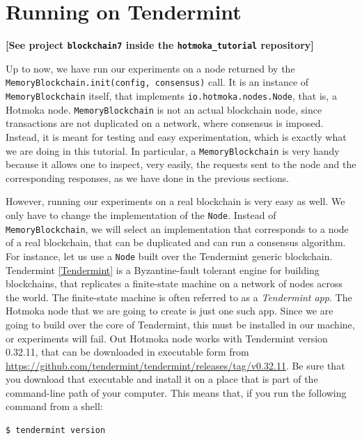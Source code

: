 \documentclass[a4paper,]{book}
\begin{document}
{{\section{Running on Tendermint }\label{running-on-tendermint}}

\textbf{{[}See project \texttt{blockchain7} inside the
\texttt{hotmoka\_tutorial} repository{]}}

Up to now, we have run our experiments on a node returned by the
\texttt{MemoryBlockchain.init(config,\ consensus)} call. It is an
instance of \texttt{MemoryBlockchain} itself, that implements
\texttt{io.hotmoka.nodes.Node}, that is, a Hotmoka node.
\texttt{MemoryBlockchain} is not an actual blockchain node, since
transactions are not duplicated on a network, where consensus is
imposed. Instead, it is meant for testing and easy experimentation,
which is exactly what we are doing in this tutorial. In particular, a
\texttt{MemoryBlockchain} is very handy because it allows one to
inspect, very easily, the requests sent to the node and the
corresponding responses, as we have done in the previous sections.

However, running our experiments on a real blockchain is very easy as
well. We only have to change the implementation of the \texttt{Node}.
Instead of \texttt{MemoryBlockchain}, we will select an implementation
that corresponds to a node of a real blockchain, that can be duplicated
and can run a consensus algorithm. For instance, let us use a
\texttt{Node} built over the Tendermint generic blockchain. Tendermint
\protect\hyperlink{tendermint}{{[}Tendermint{]}} is a Byzantine-fault
tolerant engine for building blockchains, that replicates a finite-state
machine on a network of nodes across the world. The finite-state machine
is often referred to as a \emph{Tendermint app}. The Hotmoka node that
we are going to create is just one such app. Since we are going to build
over the core of Tendermint, this must be installed in our machine, or
experiments will fail. Out Hotmoka node works with Tendermint version
0.32.11, that can be downloaded in executable form from
\url{https://github.com/tendermint/tendermint/releases/tag/v0.32.11}. Be
sure that you download that executable and install it on a place that is
part of the command-line path of your computer. This means that, if you
run the following command from a shell:

\begin{myverbatim}
\begin{verbatim}
$ tendermint version
\end{verbatim}
\end{myverbatim}

}
\end{document}
